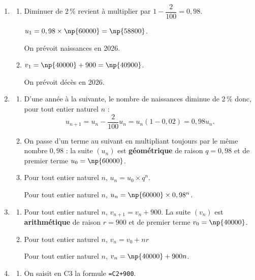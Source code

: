 \begin{enumerate}
	\item
	\begin{enumerate}
		\item Diminuer de 2\,\% revient à multiplier par $1 - \dfrac{2}{100} = 0,98$.
		
		$u_1 = 0,98 \times \np{60000} = \np{58800}$.

		On prévoit  naissances en 2026.

		\item $v_1 = \np{40000} + 900 = \np{40900}$.

		On prévoit  décès en 2026.
	\end{enumerate}

	\item
	\begin{enumerate}
		\item D'une année à la suivante, le nombre de naissances diminue de 2\,\% donc, pour tout entier naturel $n$ :
		\[u_{n+1} = u_n - \dfrac{2}{100}u_n = u_n(1 - 0,02) = 0,98u_n.\]

		\item On passe d'un terme au suivant en multipliant toujours par le même nombre $0,98$ : la suite
		$(u_n)$ est \textbf{géométrique} de raison $q = 0,98$ et de premier terme $u_0 = \np{60000}$.

		\item Pour tout entier naturel $n$, $u_n = u_0 \times q^n$.
		
		 Pour tout entier naturel $n$, $u_n = \np{60000} \times 0,98^n$.
	\end{enumerate}

	\item
	\begin{enumerate}
		\item Pour tout entier naturel $n$, $v_{n+1} = v_n + 900$. La suite $(v_n)$
		est \textbf{arithmétique} de raison $r = 900$ et de premier terme $v_0 = \np{40000}$.

		\item Pour tout entier naturel $n$,  $v_n = v_0 + nr$
		
		Pour tout entier naturel $n$, $v_n = \np{40000} + 900n$.
	\end{enumerate}

	\item
	\begin{enumerate}
		\item On saisit en C3 la formule \texttt{=C2+900}.


\end{enumerate}
\end{enumerate}
